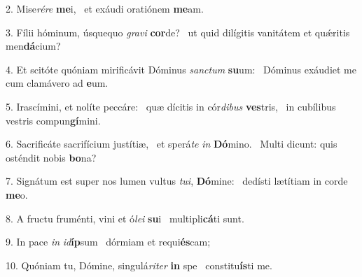 2. Mise\textit{ré}\textit{re} \textbf{me}i, \ast\  et exáudi oratiónem \textbf{me}am.\

3. Fílii hóminum, úsquequo \textit{gra}\textit{vi} \textbf{cor}de? \ast\  ut quid dilígitis vanitátem et quǽritis men\textbf{dá}cium?\

4. Et scitóte quóniam mirificávit Dóminus \textit{sanc}\textit{tum} \textbf{su}um: \ast\  Dóminus exáudiet me cum clamávero ad \textbf{e}um.\

5. Irascímini, et nolíte peccáre: \dag\  quæ dícitis in cór\textit{di}\textit{bus} \textbf{ves}tris, \ast\  in cubílibus vestris compun\textbf{gí}mini.\

6. Sacrificáte sacrifícium justítiæ, \dag\  et sperá\textit{te} \textit{in} \textbf{Dó}mino. \ast\  Multi dicunt: quis osténdit nobis \textbf{bo}na?\

7. Signátum est super nos lumen vultus \textit{tu}\textit{i}, \textbf{Dó}mine: \ast\  dedísti lætítiam in corde \textbf{me}o.\

8. A fructu fruménti, vini et ó\textit{le}\textit{i} \textbf{su}i \ast\  multipli\textbf{cá}ti sunt.\

9. In pace \textit{in} \textit{id}\textbf{íp}sum \ast\  dórmiam et requi\textbf{és}cam;\

10. Quóniam tu, Dómine, singulá\textit{ri}\textit{ter} \textbf{in} spe \ast\  constitu\textbf{ís}ti me.\

